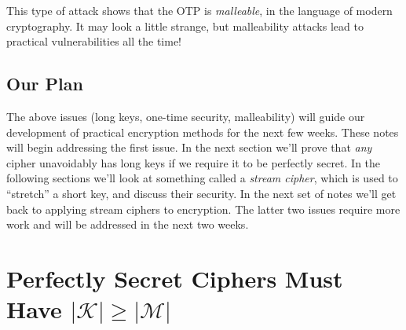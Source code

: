 \documentclass[11pt]{article}
\newcommand{\msgs}{\mathcal{M}}
\newcommand{\keys}{\mathcal{K}}
\begin{document}
\smallskip

This type of attack shows that the OTP is \emph{malleable}, in the language
of modern cryptography. It may look a little strange, but malleability attacks
lead to practical vulnerabilities all the time!

\subsection{Our Plan}

The above issues (long keys, one-time security, malleability) will guide our
development of practical encryption methods for the next few weeks. These notes
will begin addressing the first issue. In the next section we'll prove that
\emph{any} cipher unavoidably has long keys if we require it to be perfectly
secret. In the following sections we'll look at something called a \emph{stream
cipher}, which is used to ``stretch'' a short key, and discuss their security.
In the next set of notes we'll get back to applying stream ciphers to
encryption.
The latter two issues require more work and will be addressed in the next two
weeks.

\section{Perfectly Secret Ciphers Must Have $|\keys| \geq |\msgs|$}
\end{document}
